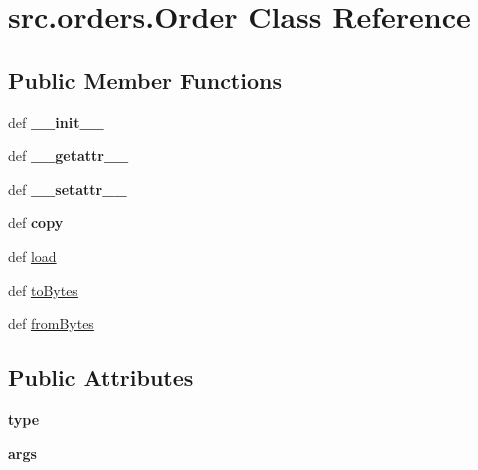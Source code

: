 \hypertarget{classsrc_1_1orders_1_1_order}{\section{src.\-orders.\-Order \-Class \-Reference}
\label{classsrc_1_1orders_1_1_order}
}
\subsection*{\-Public \-Member \-Functions}
\begin{DoxyCompactItemize}
\item 
\hypertarget{classsrc_1_1orders_1_1_order_ac1fbb5b5c8f81d1e203e478eec1a29fb}{def {\bfseries \-\_\-\-\_\-init\-\_\-\-\_\-}}\label{classsrc_1_1orders_1_1_order_ac1fbb5b5c8f81d1e203e478eec1a29fb}

\item 
\hypertarget{classsrc_1_1orders_1_1_order_a64e9fbf0310096a6532057f1b9d05c5a}{def {\bfseries \-\_\-\-\_\-getattr\-\_\-\-\_\-}}\label{classsrc_1_1orders_1_1_order_a64e9fbf0310096a6532057f1b9d05c5a}

\item 
\hypertarget{classsrc_1_1orders_1_1_order_abde48245d90eebc476ddf27ebc2c73d1}{def {\bfseries \-\_\-\-\_\-setattr\-\_\-\-\_\-}}\label{classsrc_1_1orders_1_1_order_abde48245d90eebc476ddf27ebc2c73d1}

\item 
\hypertarget{classsrc_1_1orders_1_1_order_a97a7c5d09e2acccc49fb015e518738b8}{def {\bfseries copy}}\label{classsrc_1_1orders_1_1_order_a97a7c5d09e2acccc49fb015e518738b8}

\item 
def \hyperlink{classsrc_1_1orders_1_1_order_a04d6d02084832b8e7e0d977cb333eab1}{load}
\item 
def \hyperlink{classsrc_1_1orders_1_1_order_aa48ef819154770b19b524b534283c183}{to\-Bytes}
\item 
def \hyperlink{classsrc_1_1orders_1_1_order_a727cb258b2f5d787d02eec14523f9f6b}{from\-Bytes}
\end{DoxyCompactItemize}
\subsection*{\-Public \-Attributes}
\begin{DoxyCompactItemize}
\item 
\hypertarget{classsrc_1_1orders_1_1_order_aa520998f666493616c058406413cc7dc}{{\bfseries type}}\label{classsrc_1_1orders_1_1_order_aa520998f666493616c058406413cc7dc}

\item 
\hypertarget{classsrc_1_1orders_1_1_order_a0b890f5803ed3e710da29b4d612967dc}{{\bfseries args}}\label{classsrc_1_1orders_1_1_order_a0b890f5803ed3e710da29b4d612967dc}

\end{DoxyCompactItemize}
